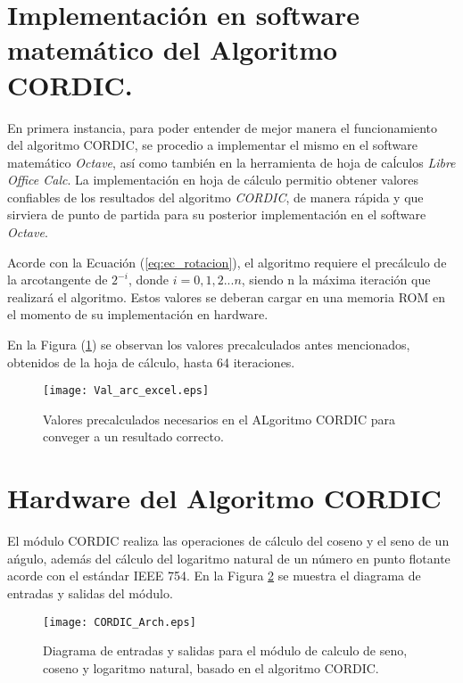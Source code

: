 \section{Implementación en software matemático del Algoritmo CORDIC.}

En primera instancia, para poder entender de mejor manera el funcionamiento del algoritmo CORDIC, se procedio a implementar el mismo en el software matemático \textit{Octave}, así como también en la herramienta de hoja de caĺculos \textit{Libre Office Calc}. La implementación en hoja de cálculo permitio obtener valores confiables de los resultados del algoritmo \textit{CORDIC}, de manera rápida y que sirviera de punto de partida para su posterior implementación en el software \textit{Octave}.

Acorde con la Ecuación (\ref{eq:ec_rotacion}), el algoritmo requiere el precálculo de la arcotangente de $2^{-i}$, donde $i = 0,1,2...n$, siendo n la máxima iteración que realizará el algoritmo. Estos valores se deberan cargar en una memoria ROM en el momento de su implementación en hardware.

En la Figura (\ref{fig:Val_arc_excel}) se observan los valores precalculados antes mencionados, obtenidos de la hoja de cálculo, hasta 64 iteraciones.

\begin{figure}[htb]
  \centering
  \texttt{[image: Val\_arc\_excel.eps]}
  \caption{Valores precalculados necesarios en el ALgoritmo CORDIC para conveger a un resultado correcto.}
  \label{fig:Val_arc_excel}
\end{figure}



\section{Hardware del Algoritmo CORDIC}

El módulo CORDIC realiza las operaciones de cálculo del coseno y el seno de un ańgulo, además del cálculo del logaritmo natural de un número en punto flotante acorde con el estándar IEEE 754. En la Figura \ref{fig:Cordic_Arch} se muestra el diagrama de entradas y salidas del módulo.

\begin{figure}[htb]
  \centering
  \texttt{[image: CORDIC\_Arch.eps]}
  \caption{Diagrama de entradas y salidas para el módulo de calculo de seno, coseno y logaritmo natural, basado en el algoritmo CORDIC.}
  \label{fig:Cordic_Arch}
\end{figure}

